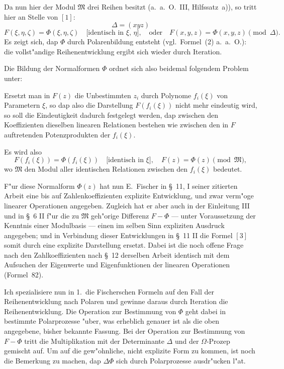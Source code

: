 \documentclass[12pt,a4paper]{article}
\begin{document}
Da nun hier der Modul $\mathfrak{M}$ drei Reihen besitzt (a.\ a.\ O.\ III, Hilfssatz~a)), so tritt hier an Stelle von $[1]$:
\begin{equation}
\Delta = (xyz)
\end{equation}
\[
F(\xi,\eta,\zeta) = \Phi(\xi,\eta,\zeta) \quad \text{[identisch in $\xi$, $\eta$]}, \quad \text{oder} \quad F(x,y,z) = \Phi(x,y,z) \pmod{\Delta}.
\]
Es zeigt sich, dap $\Phi$ durch Polarenbildung entsteht (vgl.\ Formel~(2) a.\ a.\ O.): die vollst"andige Reihenentwicklung ergibt sich wieder durch Iteration.

Die Bildung der Normalformen $\Phi$ ordnet sich also beidemal folgendem Problem unter:

Ersetzt man in $F(z)$ die Unbestimmten $z_i$ durch Polynome $f_i(\xi)$ von Parametern $\xi$, so dap also die Darstellung $F(f_i(\xi))$ nicht mehr eindeutig wird, so soll die Eindeutigkeit dadurch festgelegt werden, dap zwischen den Koeffizienten dieselben linearen Relationen bestehen wie zwischen den in $F$ auftretenden Potenzprodukten der $f_i(\xi)$.

Es wird also
\begin{equation}
F(f_i(\xi)) = \Phi(f_i(\xi)) \quad \text{[identisch in $\xi$]}, \quad F(z) = \Phi(z) \pmod{\mathfrak{M}},
\end{equation}
wo $\mathfrak{M}$ den Modul aller identischen Relationen zwischen den $f_i(\xi)$ bedeutet.

F"ur diese Normalform $\Phi(z)$ hat nun E.\ Fischer in \S\ 11, I seiner zitierten Arbeit eine bis auf Zahlenkoeffizienten explizite Entwicklung, und zwar verm"oge linearer Operationen angegeben. Zugleich hat er aber auch in der Einleitung III und in \S\ 6 II f"ur die zu $\mathfrak{M}$ geh"orige Differenz $F - \Phi$ --- unter Voraussetzung der Kenntnis einer Modulbasis --- einen im selben Sinn expliziten Ausdruck angegeben; und in Verbindung dieser Entwicklungen in \S\ 11 II die Formel $[3]$ somit durch eine explizite Darstellung ersetzt. Dabei ist die noch offene Frage nach den Zahlkoeffizienten nach \S\ 12 derselben Arbeit identisch mit dem Aufsuchen der Eigenwerte und Eigenfunktionen der linearen Operationen (Formel~82).

Ich spezialisiere nun in 1.\ die Fischerschen Formeln auf den Fall der Reihenentwicklung nach Polaren und gewinne daraus durch Iteration die Reihenentwicklung. Die Operation zur Bestimmung von $\Phi$ geht dabei in bestimmte Polarprozesse "uber, was erheblich genauer ist als die oben angegebene, bisher bekannte Fassung. Bei der Operation zur Bestimmung von $F - \Phi$ tritt die Multiplikation mit der Determinante $\Delta$ und der $\Omega$-Prozep gemischt auf. Um auf die gew"ohnliche, nicht explizite Form zu kommen, ist noch die Bemerkung zu machen, dap $\Delta\Phi$ sich durch Polarprozesse ausdr"ucken l"at.
\end{document}
